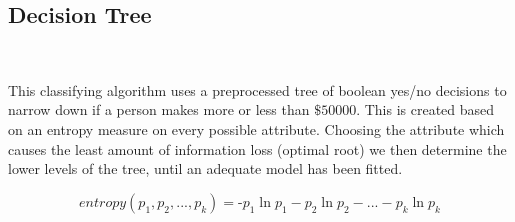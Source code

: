 \documentclass{article}
\begin{document}
		
		\subsection{Decision Tree}~
				
				This classifying algorithm uses a preprocessed tree of boolean yes/no decisions to narrow down if a person makes more or less than $ \$50000 $. This is created based on an entropy measure on every possible attribute. Choosing the attribute which causes the least amount of information loss (optimal root) we then determine the lower levels of the tree, until an adequate model has been fitted.

				\begin{equation}
					entropy(p_1,p_2,...,p_k) = \text{-}p_1 \ln{p_1}-p_2 \ln{p_2}-...-p_k \ln{p_k}
				\end{equation}
				
\end{document}
